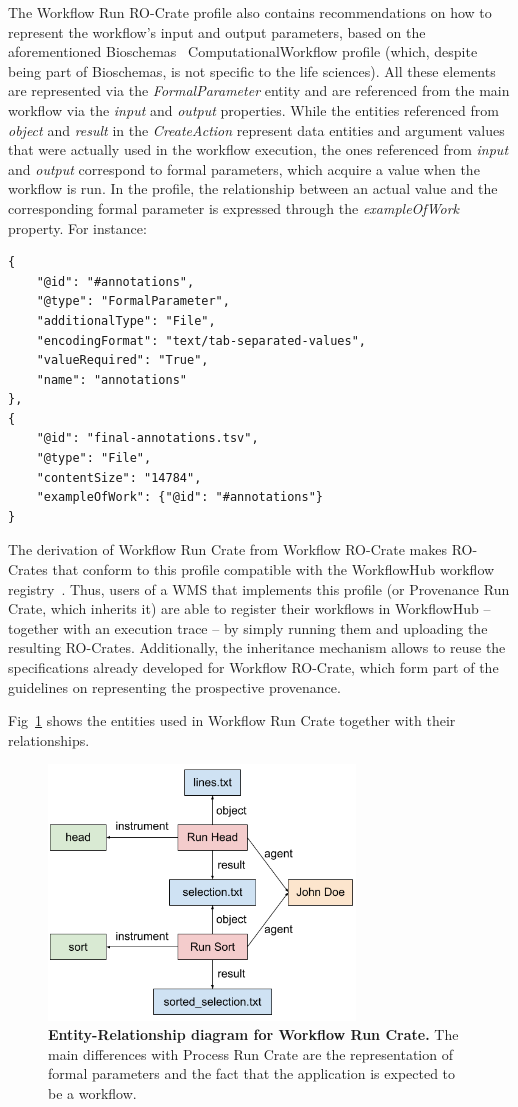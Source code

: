 \documentclass[10pt,letterpaper]{article}
\begin{document}
The Workflow Run RO-Crate profile also contains recommendations on how to represent the workflow's input and output parameters, based on the aforementioned Bioschemas~\cite{Gray 2017} ComputationalWorkflow profile (which, despite being part of Bioschemas, is not specific to the life sciences).
All these elements are represented via the \emph{FormalParameter} entity and are referenced from the main workflow via the \emph{input} and
\emph{output} properties.
While the entities referenced from
\emph{object} and \emph{result} in the \emph{CreateAction} represent data entities and argument values that were actually used in the workflow execution, the ones referenced from \emph{input} and
\emph{output} correspond to formal parameters, which acquire a value when the workflow is run.
In the profile, the relationship between an actual value and the corresponding formal parameter is expressed through the \emph{exampleOfWork} property.
For instance:

\begin{verbatim}
{
    "@id": "#annotations",
    "@type": "FormalParameter",
    "additionalType": "File",
    "encodingFormat": "text/tab-separated-values",
    "valueRequired": "True",
    "name": "annotations"
},
{
    "@id": "final-annotations.tsv",
    "@type": "File",
    "contentSize": "14784",
    "exampleOfWork": {"@id": "#annotations"}
}
\end{verbatim}

The derivation of Workflow Run Crate from Workflow RO-Crate makes RO-Crates that conform to this profile compatible with the WorkflowHub workflow registry~\cite{Goble 2021}.
Thus, users of a WMS that implements this profile (or Provenance Run Crate, which inherits it) are able to register their workflows in WorkflowHub -- together with an execution trace -- by simply running them and uploading the resulting RO-Crates.
Additionally, the inheritance mechanism allows to reuse the specifications already developed for Workflow RO-Crate, which form part of the guidelines on representing the prospective provenance.

Fig~\ref{fig:workflow_crate_er} shows the entities used in Workflow Run Crate together with their relationships.

\begin{figure}[!h]
\includegraphics[width=22em]{image3.png}
\caption{{\bf Entity-Relationship diagram for Workflow Run Crate.}
The main differences with Process Run Crate are the representation of formal parameters and the fact that the application is expected to be a workflow.}
\label{fig:workflow_crate_er}
\end{figure}
\end{document}
